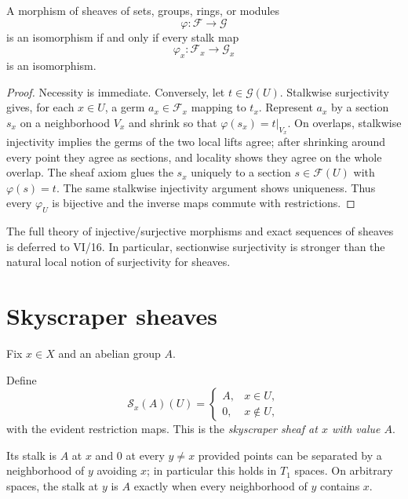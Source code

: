 \begin{theorem}
A morphism of sheaves of sets, groups, rings, or modules
\[
\varphi:\mathcal F\longrightarrow\mathcal G
\]
is an isomorphism if and only if every stalk map
\[
\varphi_x:\mathcal F_x\longrightarrow\mathcal G_x
\]
is an isomorphism.
\end{theorem}
\begin{proof}
Necessity is immediate.  Conversely, let $t\in\mathcal G(U)$.  Stalkwise surjectivity gives,
for each $x\in U$, a germ $a_x\in\mathcal F_x$ mapping to $t_x$.  Represent $a_x$ by a
section $s_x$ on a neighborhood $V_x$ and shrink so that
$\varphi(s_x)=t|_{V_x}$.  On overlaps, stalkwise injectivity implies the germs of the two
local lifts agree; after shrinking around every point they agree as sections, and locality
shows they agree on the whole overlap.  The sheaf axiom glues the $s_x$ uniquely to a
section $s\in\mathcal F(U)$ with $\varphi(s)=t$.  The same stalkwise injectivity argument
shows uniqueness.  Thus every $\varphi_U$ is bijective and the inverse maps commute with
restrictions.
\end{proof}

\begin{remark}
The full theory of injective/surjective morphisms and exact sequences of sheaves is deferred
to VI/16.  In particular, sectionwise surjectivity is stronger than the natural local notion
of surjectivity for sheaves.
\end{remark}

\section{Skyscraper sheaves}

Fix $x\in X$ and an abelian group $A$.

\begin{definition}
Define
\[
\mathcal S_x(A)(U)=
\begin{cases}
A,&x\in U,\\
0,&x\notin U,
\end{cases}
\]
with the evident restriction maps.  This is the \emph{skyscraper sheaf at $x$ with value
$A$}.
\end{definition}



Its stalk is $A$ at $x$ and $0$ at every $y\neq x$ provided points can be separated by a
neighborhood of $y$ avoiding $x$; in particular this holds in $T_1$ spaces.  On arbitrary
spaces, the stalk at $y$ is $A$ exactly when every neighborhood of $y$ contains $x$.

